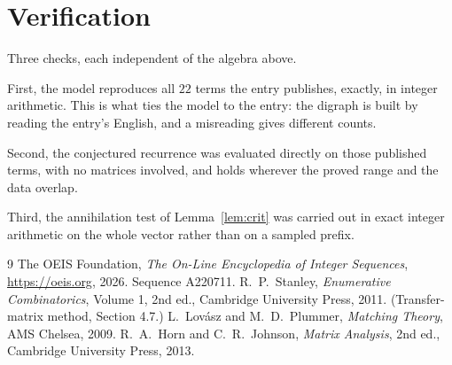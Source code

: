 \documentclass[11pt,a4paper]{article}
\theoremstyle{plain}
\theoremstyle{definition}
\begin{document}
\section{Verification}

Three checks, each independent of the algebra above.

First, the model reproduces all $22$ terms the entry publishes, exactly, in integer
arithmetic. This is what ties the model to the entry: the digraph is built by reading the
entry's English, and a misreading gives different counts.

Second, the conjectured recurrence was evaluated directly on those published terms, with no
matrices involved, and holds wherever the proved range and the data overlap.

Third, the annihilation test of Lemma~\ref{lem:crit} was carried out in exact integer
arithmetic on the whole vector rather than on a sampled prefix.

\begin{thebibliography}{9}
 The OEIS Foundation, \emph{The On-Line Encyclopedia of Integer
Sequences}, \url{https://oeis.org}, 2026. Sequence A220711.
 R.~P.~Stanley, \emph{Enumerative Combinatorics}, Volume 1, 2nd ed.,
Cambridge University Press, 2011. (Transfer-matrix method, Section 4.7.)
 L.~Lov\'asz and M.~D.~Plummer, \emph{Matching Theory}, AMS Chelsea,
2009.
 R.~A.~Horn and C.~R.~Johnson, \emph{Matrix Analysis}, 2nd ed., Cambridge
University Press, 2013.
\end{thebibliography}
\end{document}
